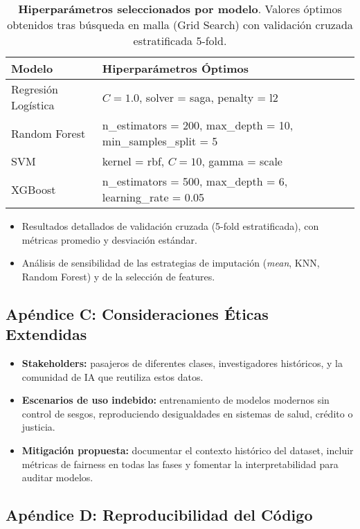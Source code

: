\documentclass[conference]{IEEEtran}
\begin{document}
\begin{table}[H]
\centering
\caption{\textbf{Hiperparámetros seleccionados por modelo}. Valores óptimos obtenidos tras búsqueda en malla (Grid Search) con validación cruzada estratificada 5-fold.}
\label{tab:hiperparametros}
\begin{tabular}{ll}
\toprule
\textbf{Modelo} & \textbf{Hiperparámetros Óptimos} \\
\midrule
Regresión Logística & $C = 1.0$, solver = saga, penalty = l2 \\
Random Forest       & n\_estimators = 200, max\_depth = 10, min\_samples\_split = 5 \\
SVM                 & kernel = rbf, $C = 10$, gamma = scale \\
XGBoost             & n\_estimators = 500, max\_depth = 6, learning\_rate = 0.05 \\
\bottomrule
\end{tabular}
\end{table}

\begin{itemize}
    \item Resultados detallados de validación cruzada (5-fold estratificada), con métricas promedio y desviación estándar.
    \item Análisis de sensibilidad de las estrategias de imputación (\textit{mean}, KNN, Random Forest) y de la selección de features.
\end{itemize}

\subsection*{Apéndice C: Consideraciones Éticas Extendidas}

\begin{itemize}
    \item \textbf{Stakeholders:} pasajeros de diferentes clases, investigadores históricos, y la comunidad de IA que reutiliza estos datos. 
    \item \textbf{Escenarios de uso indebido:} entrenamiento de modelos modernos sin control de sesgos, reproduciendo desigualdades en sistemas de salud, crédito o justicia.
    \item \textbf{Mitigación propuesta:} documentar el contexto histórico del dataset, incluir métricas de fairness en todas las fases y fomentar la interpretabilidad para auditar modelos.
\end{itemize}

\subsection*{Apéndice D: Reproducibilidad del Código}
\end{document}
